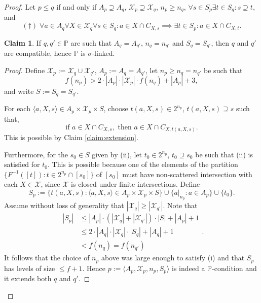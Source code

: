 \documentclass[12pt]{article}
\theoremstyle{definition}
\newtheorem{claim}[nummer]{\sc Claim}
\begin{document}
\begin{proof}
Let $p \leq q$ if and only if $A_p \supseteq A_q$, $\mathcal{X}_p \supseteq \mathcal{X}_q$, $n_p \geq n_q$, $\forall s \in S_p \exists t \in S_q: s \supseteq t$, and
\[(\dagger)\; \forall a \in A_q \forall X \in \mathcal{X}_q \forall s \in S_q: a \in X \cap C_{X,s} \implies \exists t \in S_p: a \in X \cap C_{X,t}.\]

\begin{claim}\label{claim:linked}
	If $q,q' \in \mathbb{P}$ are such that $A_q =A_{q'}$, $n_q=n_{q'}$ and $S_q=S_{q'}$, then $q$ and $q'$ are compatible, hence $\mathbb{P}$ is $\sigma$-linked.
\end{claim}

\begin{proof}
Define $\mathcal{X}_{p}:=\mathcal{X}_{q} \cup \mathcal{X}_{q'}$, $A_p:=A_q=A_{q'}$, let $n_p \geq n_q=n_{q'}$ be such that
\[f(n_p)> 2 \cdot |A_p|\cdot |\mathcal{X}_p| \cdot f(n_q) + |A_p| + 3,\]
and write $S:=S_q=S_{q'}$.

For each $\langle a, X, s\rangle \in A_p \times \mathcal{X}_p \times S$, choose $t(a,X,s)\in 2^{n_p}$, $t(a,X,s) \supseteq s$ such that,
\[\text{if } a \in X \cap C_{X,s}, \text{ then } a \in X \cap C_{X, t(a,X,s)}.\]
This is possible by Claim \ref{claim:extension}.

Furthermore, for the $s_0 \in S$ given by (ii), let $t_0 \in 2^{n_p}$,  $t_0 \supseteq s_0$ be such that (ii) is satisfied for $t_0$. This is possible because one of the elements of the partition $\{F^{-1}([t]): t \in 2^{n_p}\cap [s_0]\}$ of $[s_0]$ must have non-scattered intersection with each $X \in \mathcal{X}$, since $\mathcal{X}$ is closed under finite intersections. Define
\[S_p:=\{t(a,X,s): \langle a, X, s\rangle \in A_p \times \mathcal{X}_p \times S\} \cup \{a|_{n_p}: a \in A_p\} \cup \{t_0\}.\]
Assume without loss of generality that $|\mathcal{X}_q|\geq |\mathcal{X}_{q'}|$. Note that
\[\begin{aligned}
	|S_p|&\leq |A_p| \cdot (|\mathcal{X}_q|+|\mathcal{X}_{q'}|)\cdot |S|+|A_p|+1 \\
	&\leq 2 \cdot |A_q| \cdot |\mathcal{X}_q| \cdot |S_q|+|A_q|+1\\
	&< f(n_{q})=f(n_{q'})
\end{aligned}.\]
It follows that the choice of $n_p$ above was large enough to satisfy (i) and that $S_p$ has levels of size $\leq f+1$. Hence $p:=\langle A_p, \mathcal{X}_p, n_p, S_p\rangle$ is indeed a $\mathbb{P}$-condition and it extends both $q$ and $q'$.
\end{proof}


\end{proof}
\end{document}
